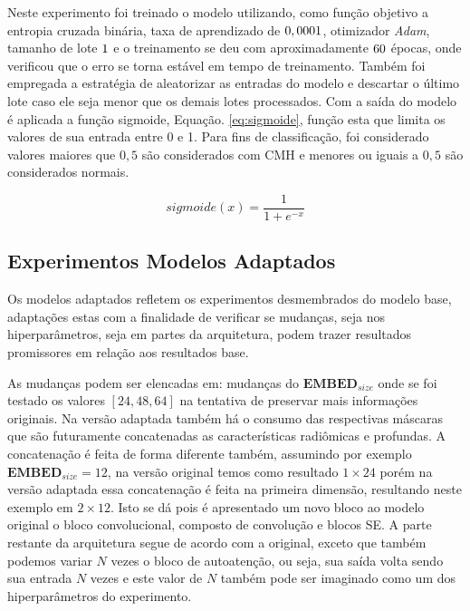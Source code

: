 Neste experimento foi treinado o modelo utilizando, como função objetivo a entropia cruzada binária, taxa de aprendizado de $0,0001$, otimizador \textit{Adam}, tamanho de lote $1$ e o treinamento se deu com aproximadamente $60$ épocas, onde verificou que o erro se torna estável em tempo de treinamento. Também foi empregada a estratégia de aleatorizar as entradas do modelo e descartar o último lote caso ele seja menor que os demais lotes processados. Com a saída do modelo é aplicada a função sigmoide, Equação. \ref{eq:sigmoide}, função esta que limita os valores de sua entrada entre 0 e 1. Para fins de classificação, foi considerado valores maiores que $0,5$ são considerados com \gls{CMH} e menores ou iguais a $0,5$ são considerados normais.

\begin{equation}
\textit{sigmoide}(x) = \frac{1}{1 + e^{-x}}
\label{eq:sigmoide}
\end{equation}

\subsection{Experimentos Modelos Adaptados}
\label{subsec:cap5_experimentos_adaptados}

Os modelos adaptados refletem os experimentos desmembrados do modelo base, adaptações estas com a finalidade de verificar se mudanças, seja nos hiperparâmetros, seja em partes da arquitetura, podem trazer resultados promissores em relação aos resultados base.

As mudanças podem ser elencadas em: mudanças do $\textbf{EMBED}_{size}$ onde se foi testado os valores $[24, 48, 64]$ na tentativa de preservar mais informações originais. Na versão adaptada também há o consumo das respectivas máscaras que são futuramente concatenadas as características radiômicas e profundas. A concatenação é feita de forma diferente também, assumindo por exemplo $\textbf{EMBED}_{size} = 12$, na versão original temos como resultado $1\times24$ porém na versão adaptada essa concatenação é feita na primeira dimensão, resultando neste exemplo em $2\times12$. Isto se dá pois é apresentado um novo bloco ao modelo original o bloco convolucional, composto de convolução e blocos \gls{SE}. A parte restante da arquitetura segue de acordo com a original, exceto que também podemos variar $N$ vezes o bloco de autoatenção, ou seja, sua saída volta sendo sua entrada $N$ vezes e este valor de $N$ também pode ser imaginado como um dos hiperparâmetros do experimento.

